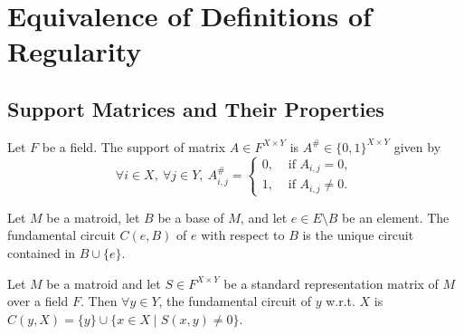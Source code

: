 \section{Equivalence of Definitions of Regularity}

\subsection{Support Matrices and Their Properties}

\begin{definition}\label{def:support_matrix}
    Let $F$ be a field. The support of matrix $A \in F^{X \times Y}$ is $A^{\#} \in \{0, 1\}^{X \times Y}$ given by
    \[
        \forall i \in X, \ \forall j \in Y, \ A^{\#}_{i, j} = \begin{cases}
            0, & \text{ if } A_{i, j} = 0, \\
            1, & \text{ if } A_{i, j} \neq 0.
        \end{cases}
    \]
\end{definition}

\begin{definition}\label{def:fundamental_circuit}
    Let $M$ be a matroid, let $B$ be a base of $M$, and let $e \in E \setminus B$ be an element. The fundamental circuit $C (e, B)$ of $e$ with respect to $B$ is the unique circuit contained in $B \cup \{e\}$.
\end{definition}

\begin{lemma}\label{lem:std_repr_fundamental_circuits}
    Let $M$ be a matroid and let $S \in F^{X \times Y}$ be a standard representation matrix of $M$ over a field $F$. Then $\forall y \in Y$, the fundamental circuit of $y$ w.r.t. $X$ is $C (y, X) = \{y\} \cup \{x \in X \mid S (x, y) \neq 0\}$.
\end{lemma}

